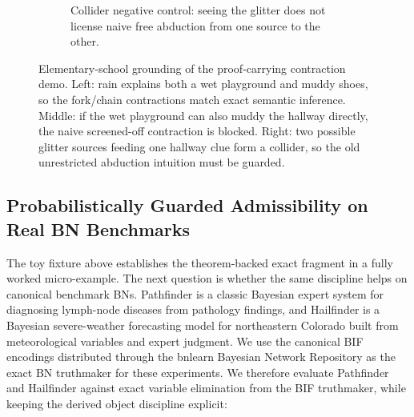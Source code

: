\documentclass[11pt,openany]{report}
\begin{document}
\begin{figure}[H]
\medskip
\begin{subfigure}[t]{0.68\textwidth}
\centering
{}
\caption{Collider negative control: seeing the glitter does not license naive free abduction from one source to the other.}
\end{subfigure}
\caption{Elementary-school grounding of the proof-carrying contraction demo.  Left: rain explains both a wet playground and muddy shoes, so the fork/chain contractions match exact semantic inference.  Middle: if the wet playground can also muddy the hallway directly, the naive screened-off contraction is blocked.  Right: two possible glitter sources feeding one hallway clue form a collider, so the old unrestricted abduction intuition must be guarded.}
\label{fig:proof-carrying-contraction-school}
\end{figure}

\subsection{Probabilistically Guarded Admissibility on Real BN Benchmarks}

The toy fixture above establishes the theorem-backed exact fragment in a
fully worked micro-example.  The next question is whether the same
discipline helps on canonical benchmark BNs.  Pathfinder is a classic
Bayesian expert system for diagnosing lymph-node diseases from pathology
findings,\cite{Heckerman1992Pathfinder} and Hailfinder is a Bayesian
severe-weather forecasting model for northeastern Colorado built from
meteorological variables and expert judgment.\cite{Abramson1996Hailfinder}
We use the canonical BIF encodings distributed through the bnlearn
Bayesian Network Repository as the exact BN truthmaker for these
experiments.\cite{ScutariBnRepository} We therefore evaluate Pathfinder
and Hailfinder against exact variable elimination from the BIF
truthmaker, while keeping the derived object discipline explicit:
\smallskip
\end{document}
